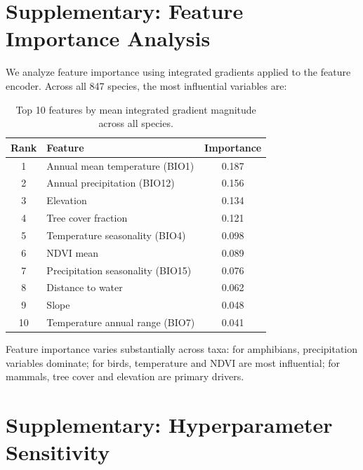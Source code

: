 \documentclass[11pt,a4paper]{article}
\begin{document}
\appendix
\section{Supplementary: Feature Importance Analysis}
\label{app:features}

We analyze feature importance using integrated gradients
\citep{chen2020deep} applied to the feature encoder. Across all 847
species, the most influential variables are:

\begin{table}[H]
\centering
\caption{Top 10 features by mean integrated gradient magnitude across all
species.}
\label{tab:features}
\begin{tabular}{clc}
\toprule
\textbf{Rank} & \textbf{Feature} & \textbf{Importance} \\
\midrule
1  & Annual mean temperature (BIO1)      & 0.187 \\
2  & Annual precipitation (BIO12)        & 0.156 \\
3  & Elevation                           & 0.134 \\
4  & Tree cover fraction                 & 0.121 \\
5  & Temperature seasonality (BIO4)      & 0.098 \\
6  & NDVI mean                           & 0.089 \\
7  & Precipitation seasonality (BIO15)   & 0.076 \\
8  & Distance to water                   & 0.062 \\
9  & Slope                               & 0.048 \\
10 & Temperature annual range (BIO7)     & 0.041 \\
\bottomrule
\end{tabular}
\end{table}

Feature importance varies substantially across taxa: for amphibians,
precipitation variables dominate; for birds, temperature and NDVI are
most influential; for mammals, tree cover and elevation are primary
drivers.

\section{Supplementary: Hyperparameter Sensitivity}
\label{app:hyperparameters}
\end{document}
